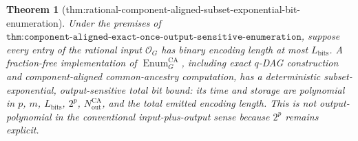 \documentclass{article}
\newtheorem{theorem}{Theorem}
\begin{document}
\begin{theorem}[thm:rational-component-aligned-subset-exponential-bit-enumeration]\label{thm:rational-component-aligned-subset-exponential-bit-enumeration}
Under the premises of \(\texttt{thm:component-aligned-exact-once-output-sensitive-enumeration}\), suppose every entry of the rational input \(\mathcal O_G\) has binary encoding length at most \(L_{\mathrm{bits}}\). A fraction-free implementation of \(\operatorname{Enum}_G^{\mathrm{CA}}\), including exact \(q\)-DAG construction and component-aligned common-ancestry computation, has a deterministic subset-exponential, output-sensitive total bit bound: its time and storage are polynomial in \(p\), \(m\), \(L_{\mathrm{bits}}\), \(2^p\), \(N_{\mathrm{out}}^{\mathrm{CA}}\), and the total emitted encoding length. This is not output-polynomial in the conventional input-plus-output sense because \(2^p\) remains explicit.
\end{theorem}
\end{document}
